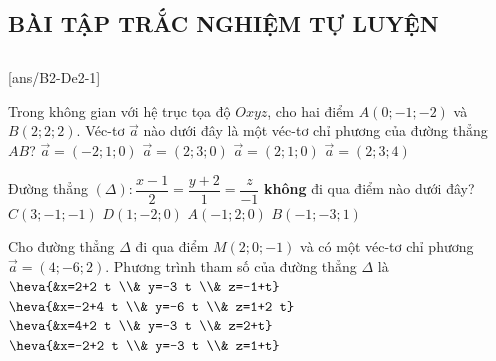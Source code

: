 \subsection{BÀI TẬP TRẮC NGHIỆM TỰ LUYỆN}
\subsection*{} 
	\setcounter{ex}{0}
	[ans/B2-De2-1]
\begin{ex}%
	Trong không gian với hệ trục tọa độ $O x y z$, cho hai điểm $A(0 ;-1 ;-2)$ và $B(2 ; 2 ; 2)$. Véc-tơ $\overrightarrow{a}$ nào dưới đây là một véc-tơ chỉ phương của đường thẳng $A B$?
	\choice
	{$\overrightarrow{a}=(-2 ; 1 ; 0)$}
	{$\overrightarrow{a}=(2 ; 3 ; 0)$}
	{$\overrightarrow{a}=(2 ; 1 ; 0)$}
	{\True $\overrightarrow{a}=(2 ; 3 ; 4)$}
\end{ex}

\begin{ex}%
	Đường thẳng $(\Delta)\colon \dfrac{x-1}{2}=\dfrac{y+2}{1}=\dfrac{z}{-1}$ \textbf{không} đi qua điểm nào dưới đây?
	\choice
	{$C(3 ;-1 ;-1)$}
	{$D(1 ;-2 ; 0)$}
	{\True $A(-1 ; 2 ; 0)$}
	{$B(-1 ;-3 ; 1)$}
\end{ex}

\begin{ex}%
	Cho đường thẳng $\Delta$ đi qua điểm $M(2 ; 0 ;-1)$ và có một véc-tơ chỉ phương $\overrightarrow{a}=(4 ;-6 ; 2)$. Phương trình tham số của đường thẳng $\Delta$ là
	\choice
	{\True $\heva{&x=2+2 t \\& y=-3 t \\& z=-1+t}$}
	{$\heva{&x=-2+4 t \\& y=-6 t \\& z=1+2 t}$}
	{$\heva{&x=4+2 t \\& y=-3 t \\& z=2+t}$}
	{$\heva{&x=-2+2 t \\& y=-3 t \\& z=1+t}$}
\end{ex}

